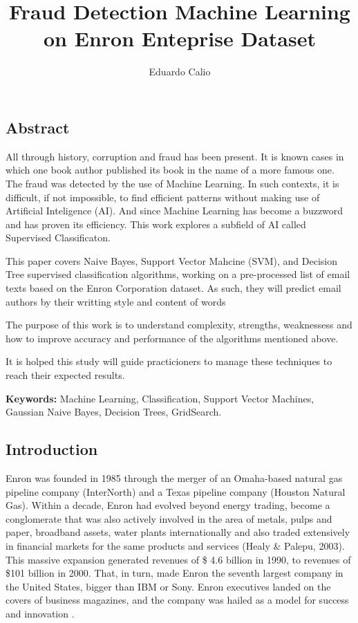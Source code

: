 \documentclass[11pt]{article}
\title{Fraud Detection Machine Learning on Enron Enteprise Dataset}
\author{Eduardo Calio}
\begin{document}
    

    
    \maketitle
    
   
   
    \begin{multicols}{2}
    \subsection{Abstract}\label{abstract}
  
All through history, corruption and fraud has been present. It is known
cases in which one book author published its book in the name of a more
famous one. The fraud was detected by the use of Machine Learning. In
such contexts, it is difficult, if not impossible, to find efficient
patterns without making use of Artificial Inteligence (AI). And since
Machine Learning has become a buzzword and has proven its efficiency.
This work explores a subfield of AI called Supervised Classificaton.

This paper covers Naive Bayes, Support Vector Mahcine (SVM), and
Decision Tree supervised classification algorithms, working on a
pre-processed list of email texts based on the Enron Corporation
dataset. As such, they will predict email authors by their writting
style and content of words

The purpose of this work is to understand complexity, strengths,
weaknessess and how to improve accuracy and performance of the
algorithms mentioned above.

It is holped this study will guide practicioners to manage these
techniques to reach their expected results.

\textbf{Keywords:} Machine Learning, Classification, Support Vector
Machines, Gaussian Naive Bayes, Decision Trees, GridSearch.

\subsection{Introduction}\label{introduction}

Enron was founded in 1985 through the merger of an Omaha-based natural
gas pipeline company (InterNorth) and a Texas pipeline company (Houston
Natural Gas). Within a decade, Enron had evolved beyond energy trading,
become a conglomerate that was also actively involved in the area of
metals, pulps and paper, broadband assets, water plants internationally
and also traded extensively in financial markets for the same products
and services (Healy \& Palepu, 2003). This massive expansion generated
revenues of \$ 4.6 billion in 1990, to revenues of \$101 billion in
2000. That, in turn, made Enron the seventh largest company in the
United States, bigger than IBM or Sony. Enron executives landed on the
covers of business magazines, and the company was hailed as a model for
success and innovation \cite{davis2007social}.


\end{multicols}
\end{document}

